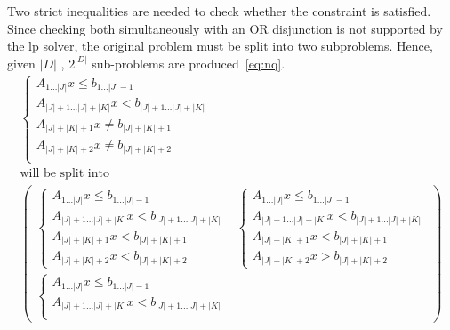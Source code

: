\documentclass[runningheads]{llncs}
\begin{document}
Two strict inequalities are needed to check whether the constraint is satisfied.
Since checking both simultaneously with an OR disjunction is not supported by the \gls{lp} solver, the original problem must be split into two subproblems.
Hence, given $|D|$ \nqcs, $2^{|D|}$ sub-problems are produced~\eqref{eq:nq}.
\begin{equation}
    \label{eq:nq}
    \begin{gathered}
        \begin{cases}
            A_{1 \dots |J|} x \le b_{1 \dots |J| - 1}                 \\
            A_{|J| + 1\dots |J| + |K|} x < b_{|J| + 1\dots |J| + |K|} \\
            A_{|J| + |K| + 1} x \ne b_{|J| + |K| + 1}                 \\
            A_{|J| + |K| + 2} x \ne b_{|J| + |K| + 2}                 \\
        \end{cases}
        \\
        \text{will be split into}
        \\
        \begin{pmatrix}
            \begin{cases}
                A_{1 \dots |J|} x \le b_{1 \dots |J| - 1}                 \\
                A_{|J| + 1\dots |J| + |K|} x < b_{|J| + 1\dots |J| + |K|} \\
                A_{|J| + |K| + 1} x < b_{|J| + |K| + 1}                   \\
                A_{|J| + |K| + 2} x < b_{|J| + |K| + 2}
            \end{cases}
             &
            \begin{cases}
                A_{1 \dots |J|} x \le b_{1 \dots |J| - 1}                 \\
                A_{|J| + 1\dots |J| + |K|} x < b_{|J| + 1\dots |J| + |K|} \\
                A_{|J| + |K| + 1} x < b_{|J| + |K| + 1}                   \\
                A_{|J| + |K| + 2} x > b_{|J| + |K| + 2}
            \end{cases}
            \\
            \begin{cases}
                A_{1 \dots |J|} x \le b_{1 \dots |J| - 1}                 \\
                A_{|J| + 1\dots |J| + |K|} x < b_{|J| + 1\dots |J| + |K|} \\

\end{cases}
\end{pmatrix}
\end{gathered}
\end{equation}
\end{document}
